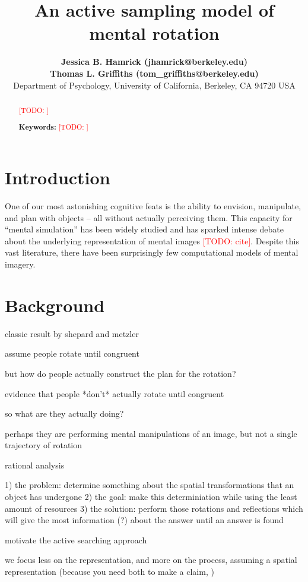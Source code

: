 \documentclass[10pt,letterpaper]{article}
\title{An active sampling model of mental rotation}
\author{{\large \bf Jessica B. Hamrick (jhamrick@berkeley.edu)} \\
  {\large \bf Thomas L. Griffiths (tom\_griffiths@berkeley.edu)} \\
  Department of Psychology, University of California, Berkeley, CA
  94720 USA}
\newcommand{\TODO}[1]{\textcolor{red}{[TODO: #1]}}
\begin{document}
\maketitle


\begin{abstract}
\TODO{}

\textbf{Keywords:} 
\TODO{}
\end{abstract}


\section{Introduction}

One of our most astonishing cognitive feats is the ability to
envision, manipulate, and plan with objects -- all without actually
perceiving them. This capacity for ``mental simulation'' has been
widely studied and has sparked intense debate about the underlying
representation of mental images \TODO{cite}. Despite this vast
literature, there have been surprisingly few computational models of
mental imagery.



\section{Background}

classic result by shepard and metzler

assume people rotate until congruent

but how do people actually construct the plan for the rotation?

evidence that people *don't* actually rotate until congruent

so what are they actually doing?

perhaps they are performing mental manipulations of an image, but not
a single trajectory of rotation

rational analysis \cite{Marr:1983to,anderson90,Shepard:1987tt}

1) the problem: determine something about the spatial transformations
that an object has undergone
2) the goal: make this determiniation while using the least amount of
resources
3) the solution: perform those rotations and reflections which will
give the most information (?) about the answer until an answer is
found

motivate the active searching approach
\cite{Gureckis:2012gu,Markant:2012uu} \cite{Markant:2012uu,Nelson2007}

we focus less on the representation, and more on the process, assuming
a spatial representation (because you need both to make a claim,
\cite{Anderson1978})
\end{document}
